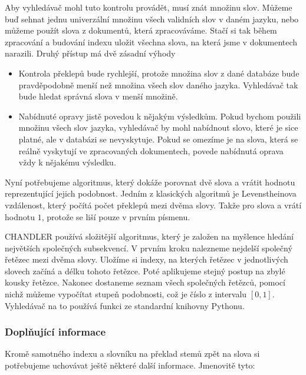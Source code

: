 \documentclass[12pt]{article}
\newcommand{\name}{CHANDLER}
\newcommand{\sssection}[1]{\subsubsection{#1}}
\begin{document}
Aby vyhledávač mohl tuto kontrolu provádět, musí znát množinu  slov. Můžeme buď sehnat jednu univerzální množinu všech validních slov v daném jazyku, nebo můžeme použít slova z dokumentů, která zpracováváme. Stačí si tak během zpracování a budování indexu uložit všechna slova, na která jsme v dokumentech narazili. Druhý přístup má dvě zásadní výhody

\begin{itemize}
	\item Kontrola překlepů bude rychlejší, protože množina slov z dané databáze bude pravděpodobně menší než množina všech slov daného jazyka. Vyhledávač tak bude hledat správná slova v menší množině. 
	\item Nabídnuté opravy jistě povedou k nějakým výsledkům. Pokud bychom použili množinu všech slov jazyka, vyhledávač by mohl nabídnout slovo, které je sice platné, ale v databázi se nevyskytuje. Pokud se omezíme je na slova, která se reálně vyskytují ve zpracovaných dokumentech, povede nabídnutá oprava vždy k nějakému výsledku.
\end{itemize}

Nyní potřebujeme algoritmus, který dokáže porovnat dvě slova a vrátit hodnotu reprezentující jejich podobnost. Jedním z klasických algoritmů je Levenstheinova vzdálenost, který počítá počet překlepů mezi dvěma slovy. Takže pro slova  a  vrátí hodnotu $1$, protože se liší pouze v prvním písmenu. 

\name{} používá složitější algoritmus, který je založen na myšlence hledání největších společných subsekvencí. V prvním kroku nalezneme nejdelší společný řetězec mezi dvěma slovy. Uložíme si indexy, na kterých řetězec v jednotlivých slovech začíná a délku tohoto řetězce. Poté aplikujeme stejný postup na zbylé kousky řetězce. Nakonec dostaneme seznam všech společných řetězců, pomocí nichž můžeme vypočítat stupeň podobnosti, což je číslo z intervalu $[0, 1]$. Vyhledávač na to používá funkci ze standardní knihovny Pythonu. 



\sssection{Doplňující informace}
Kromě samotného indexu a slovníku na překlad stemů zpět na slova si potřebujeme uchovávat ještě některé další informace. Jmenovitě tyto: 
\end{document}

